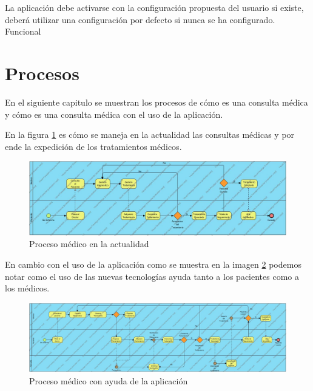 	
	\begin{ReqSist}
		{La aplicación debe activarse con la configuración propuesta del usuario si existe, deberá utilizar una configuración por defecto si nunca se ha configurado.}
		{\alta}
		{}
		{Funcional}
		
	\end{ReqSist}
	
	
	
	


\section{Procesos}

En el siguiente capitulo se muestran los procesos de cómo es una consulta médica y cómo es una consulta médica con el uso de la aplicación.


En la figura \ref{fig:proceso1} es cómo se maneja en la actualidad las consultas médicas y por ende la expedición de los tratamientos médicos.
\begin{figure}[htb]
	\centering
	\includegraphics[width=1.1\textwidth]{images/cap2/ProcesoMedico}
	\caption{Proceso médico en la actualidad} \label{fig:proceso1}
\end{figure}

En cambio con el uso de la aplicación como se muestra en la imagen \ref{fig:proceso2} podemos notar como el uso de las nuevas tecnologías ayuda tanto a los pacientes como a los médicos.

\begin{figure}[htb]
	\centering
	\includegraphics[width=1.1\textwidth]{images/cap2/RemPillstratamiento}
	\caption{Proceso médico con ayuda de la aplicación} \label{fig:proceso2}
\end{figure}


